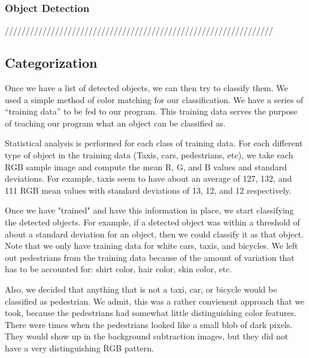 \documentclass[a4paper, 10pt, conference]{ieeeconf}      %
\begin{document}
\subsubsection{Object Detection}



////////////////////////////////////////////////////////////////




\subsection{Categorization}

Once we have a list of detected objects, we can then try to classify them. We used a simple method of color matching for our classification. We have a series of “training data” to be fed to our program. This training data serves the purpose of teaching our program what an object can be classified as. \newline

Statistical analysis is performed for each class of training data. For each different type of object in the training data (Taxis, cars, pedestrians, etc), we take each RGB sample image and compute the mean R, G, and B values and standard deviations. For example, taxis seem to have about an average of 127, 132, and 111 RGB mean values with standard deviations of 13, 12, and 12 respectively. \newline

Once we have "trained" and have this information in place, we start classifying the detected objects. For example, if a detected object was within a threshold of about a standard deviation for an object, then we could classify it as that object. Note that we only have training data for white cars, taxis, and bicycles. We left out pedestrians from the training data because of the amount of variation that has to be accounted for: shirt color, hair color, skin color, etc. \newline

Also, we decided that anything that is not a taxi, car, or bicycle would be classified as pedestrian. We admit, this was a rather convienent approach that we took, because the pedestrians had somewhat little distinguishing color features. There were times when the pedestrians looked like a small blob of dark pixels. They would show up in the background subtraction images, but they did not have a very distinguishing RGB pattern.\newline
\end{document}
